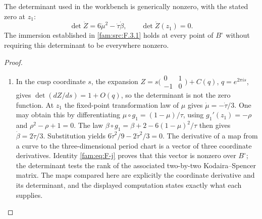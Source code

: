 \begin{proposition}\label{fam:src:F.3.3}\label{fam:st:F.3.3}

The determinant used in the workbench is generically nonzero, with
the stated zero at $z_1$:
\[
 \det\dot Z=6\dot\mu^2-\dot\tau\dot\beta,\qquad
 \det\dot Z(z_1)=0.
\]
The immersion established in \ref{fam:src:F.3.1} holds at every point of $B^\circ$
without requiring this determinant to be everywhere nonzero.
\end{proposition}



\begin{proof}
\begin{enumerate}[label=\arabic*.,leftmargin=*]
\item In the cusp coordinate $s$, the expansion
$Z=s\bigl(\begin{smallmatrix}0&1\\-1&0\end{smallmatrix}\bigr)+C(q)$,
$q=e^{2\pi is}$, gives
$\det(dZ/ds)=1+O(q)$, so the determinant is not the zero function.
At $z_1$ the fixed-point transformation law of $\mu$ gives
$\dot\mu=-\dot\tau/3$.  One may obtain this by differentiating
$\mu\circ g_1=(1-\mu)/\tau$, using
$g_1'(z_1)=-\rho$ and $\rho^2-\rho+1=0$.
The law
$\beta\circ g_1=\beta+2-6(1-\mu)^2/\tau$ then gives
$\dot\beta=2\dot\tau/3$.  Substitution yields
$6\dot\tau^2/9-2\dot\tau^2/3=0$.
The derivative of a map from a curve to the three-dimensional period
chart is a vector of three coordinate derivatives.  Identity
\eqref{fam:eq:F-j} proves that this vector is nonzero over $B^\circ$;
the determinant tests the rank of the associated two-by-two
Kodaira--Spencer matrix.  The maps compared here are explicitly the
coordinate derivative and its determinant, and the displayed computation
states exactly what each supplies.
\end{enumerate}
\end{proof}



